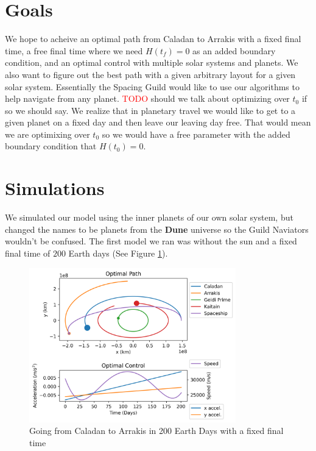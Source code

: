 \documentclass[11pt]{amsart}
\begin{document}
\section{Goals}
We hope to acheive an optimal path from Caladan to Arrakis with a fixed final time, a free final time where we need $H(t_f) = 0$ as an added boundary condition, and an optimal control
with multiple solar systems and planets. We also want to figure out the best path with a given arbitrary layout for a given solar system. Essentially the Spacing Guild would like to use 
our algorithms to help navigate from any planet. \textcolor{red}{TODO} should we talk about optimizing over $t_0$ if so we should say. We realize that in planetary travel we would like to 
get to a given planet on a fixed day and then leave our leaving day free. That would mean we are optimixing over $t_0$ so we would have a free parameter with the added boundary condition that
$H(t_0) = 0$.


\section{Simulations}
We simulated our model using the inner planets of our own solar system, but changed the names to be planets from the \textbf{Dune} universe so the Guild Naviators wouldn't be confused.
The first model we ran was without the sun and a fixed final time of $200$ Earth days (See Figure \ref{fig:fixed_time_no_sun}). 

\begin{figure}[htp]
    \centering
    \includegraphics[width=0.8\textwidth]{f2.png}\hfill
    \caption{Going from Caladan to Arrakis in 200 Earth Days with a fixed final time}
    \label{fig:fixed_time_no_sun}
\end{figure}
\end{document}
